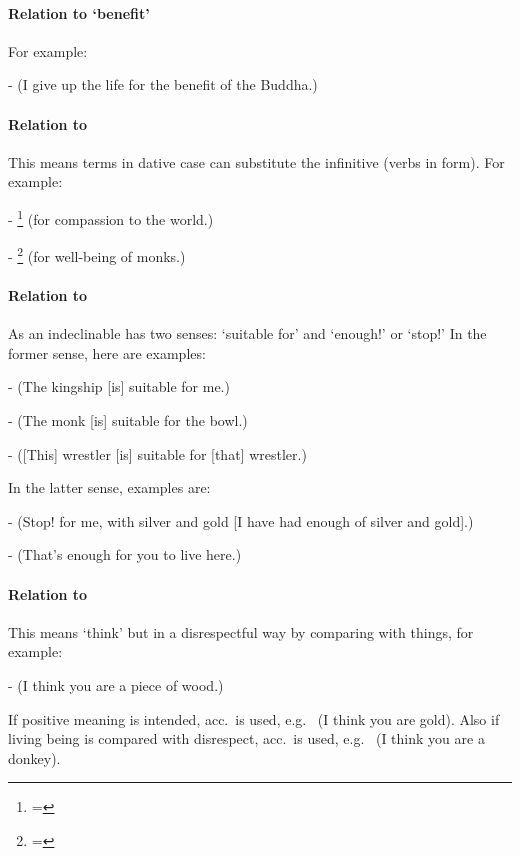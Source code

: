 \paragraph*{Relation to `benefit'} For example:\par
-  (I give up the life for the benefit of the Buddha.)\par
								 
\paragraph*{Relation to } This means terms in dative case can substitute the infinitive (verbs in  form). For example:\par
- \footnote{= } (for compassion to the world.)\par
- \footnote{= } (for well-being of monks.)\par
								 
\paragraph*{Relation to } As an indeclinable  has two senses: `suitable for' and `enough!' or `stop!' In the former sense, here are examples:\par
-  (The kingship [is] suitable for me.)\par
-  (The monk [is] suitable for the bowl.)\par
-  ([This] wrestler [is] suitable for [that] wrestler.)\par
In the latter sense, examples are:\par
-  (Stop! for me, with silver and gold [I have had enough of silver and gold].)\par
-  (That's enough for you to live here.)\par
								 
\paragraph*{Relation to } This means `think' but in a disrespectful way by comparing with things, for example:\par
-  (I think you are a piece of wood.)\par
If positive meaning is intended, acc.\ is used, e.g.\  (I think you are gold). Also if living being is compared with disrespect, acc.\ is used, e.g.\  (I think you are a donkey).

